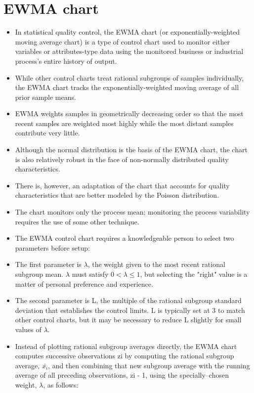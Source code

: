 \documentclass[11pt]{article} %
\begin{document}
\tableofcontents
\newpage
\section{EWMA chart}
\begin{itemize}
\item In statistical quality control, the EWMA chart (or exponentially-weighted moving average chart) is a type of control chart used to monitor either variables or attributes-type data using the monitored business or industrial process's entire history of output.
\item While other control charts treat rational subgroups of samples individually, the EWMA chart tracks the exponentially-weighted moving average of all prior sample means. 
\item EWMA weights samples in geometrically decreasing order so that the most recent samples are weighted most highly while the most distant samples contribute very little.
\item 
Although the normal distribution is the basis of the EWMA chart, the chart is also relatively robust in the face of non-normally distributed quality characteristics.
\item There is, however, an adaptation of the chart that accounts for quality characteristics that are better modeled by the Poisson distribution.
\item The chart monitors only the process mean; monitoring the process variability requires the use of some other technique.
\item 
The EWMA control chart requires a knowledgeable person to 
select two parameters before setup:
\item 
The first parameter is $\lambda$, the weight given to the most recent rational subgroup mean. $\lambda$ must satisfy $0 < \lambda \leq 1$, but selecting the "right" value is a matter of personal preference and experience. 
\item The second parameter is L, the multiple of the rational subgroup standard deviation that establishes the control limits. L is typically set at 3 to match other control charts, but it may be necessary to reduce L slightly for small values of $\lambda$.
\item Instead of plotting rational subgroup averages directly, the EWMA chart computes successive observations zi by computing the rational subgroup average, $\bar{x_i}$, and then combining that new subgroup average with the running average of all preceding observations, zi - 1, using the specially–chosen weight, $\lambda$, as follows:


\end{itemize}
\end{document}
